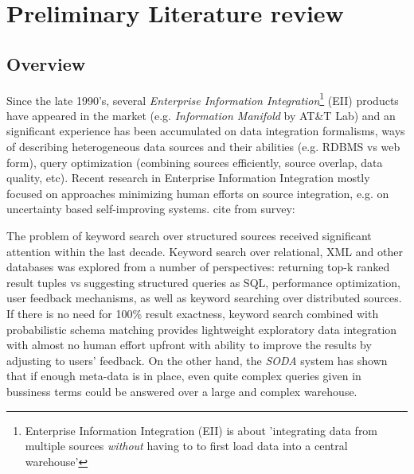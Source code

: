 \section{Preliminary Literature review}


\subsection{Overview}


Since the late 1990's, several \textit{Enterprise Information Integration}\footnote{%
	Enterprise Information Integration (EII) is about 'integrating data from 
	multiple sources 	\textit{without} having to to first load data into
	 a central warehouse'\cite[p.1]{eii_2005}}
 (EII) products have appeared in the market (e.g. \textit{Information Manifold} by AT\&T Lab) and an significant experience has been accumulated on data integration formalisms, ways of describing heterogeneous data sources and their abilities (e.g. RDBMS vs web form), query optimization (combining sources efficiently, source overlap, data quality, etc)\cite{eii_2005}. 
%
Recent research in  Enterprise Information Integration mostly focused on approaches minimizing  human efforts on source integration, e.g. on uncertainty based self-improving systems\cite[ch.19]{principles_data_integration}.  {\color{red} cite from survey: \cite{IIHet_survey08}}

The problem of keyword search over structured sources received significant attention within the last decade. Keyword search over relational, XML and other databases was explored from a number of perspectives: returning top-k ranked result tuples vs suggesting structured queries as SQL, performance optimization, user feedback mechanisms, as well as keyword searching over distributed sources. 
%
If there is no need for 100\% result exactness, keyword search combined with probabilistic schema matching provides lightweight exploratory data integration with almost no human effort upfront with ability to improve the results by adjusting to users' feedback\cite[ch.16]{principles_data_integration}. On the other hand, the \textit{SODA} system has shown that if enough meta-data is in place, even quite complex queries given in bussiness terms could be answered over a large and complex warehouse.

